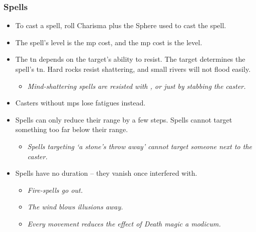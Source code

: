 \subsubsection*{Spells}
\begin{itemize}
  \item
  To cast a spell, roll Charisma plus the Sphere used to cast the spell.
  \item
  The spell's level is the \gls{mp} cost, and the \gls{mp} cost is the level.
  \item
  The \gls{tn} depends on the target's ability to resist.
  The target determines the spell's \gls{tn}.
  Hard rocks resist shattering, and small rivers will not flood easily.
  \begin{itemize}
    \item
    \textit{Mind-shattering spells are resisted with , or just by stabbing the caster.}
  \end{itemize}
  \item
  Casters without \glspl{mp} lose \glspl{fatigue} instead.
  \item
  Spells can only reduce their range by a few \glspl{step}.
  Spells cannot target something too far below their range.
  \begin{itemize}
    \item
    \textit{Spells targeting `a stone's throw away' cannot target someone next to the caster.}
  \end{itemize}
  \item
  Spells have no duration -- they vanish once interfered with.
  \begin{itemize}
    \item
    \textit{Fire-spells go out.}
    \item
    \textit{The wind blows illusions away.}
    \item
    \textit{Every movement reduces the effect of Death magic a modicum.}
  \end{itemize}
\end{itemize}

